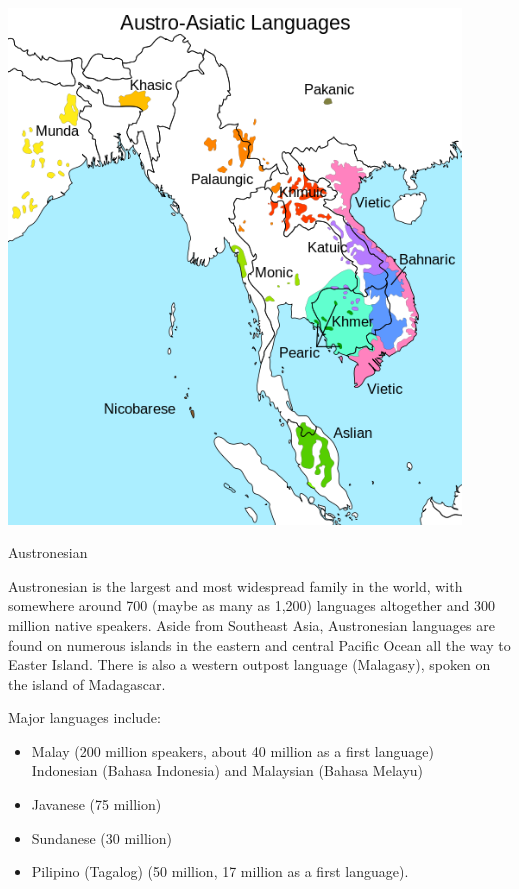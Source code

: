 \documentclass{beamer}
\begin{document}
\begin{frame}
  \includegraphics[width=0.9\textwidth]{pics/image5.png}
\end{frame}





\begin{frame}{Austronesian}

Austronesian is the largest and most widespread family in the
world, with somewhere around 700 (maybe as many as 1,200) languages
altogether and 300 million native speakers. Aside from Southeast Asia,
Austronesian languages are found on numerous islands in the eastern and
central Paciﬁc Ocean all the way to Easter Island. There is also a western
outpost language (Malagasy), spoken on the island of Madagascar.

Major languages include:
\begin{itemize}
\item Malay (200 million speakers, about 40 million as a ﬁrst language)
  \\  Indonesian (Bahasa Indonesia) and Malaysian (Bahasa Melayu)
\item Javanese (75 million)
\item Sundanese (30 million)
\item Pilipino (Tagalog) (50 million, 17 million as a ﬁrst language).
\end{itemize}
  
\end{frame}
\end{document}
